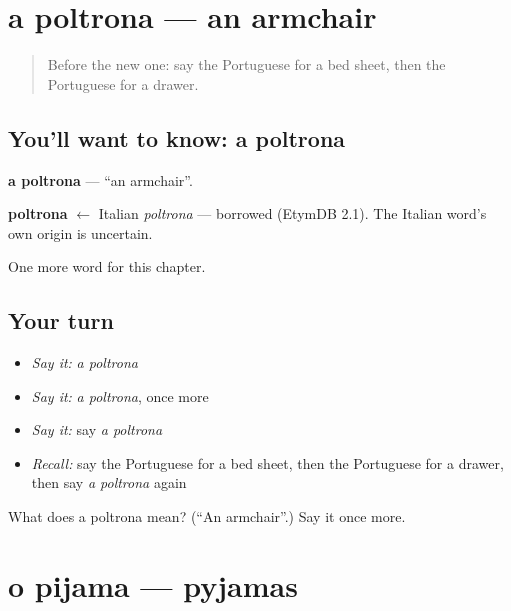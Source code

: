 \section[a poltrona]{a poltrona — an armchair}

\label{lesson:PT-C188-poltrona}



\begin{quote}
Before the new one: say the Portuguese for a bed sheet, then the Portuguese for a drawer.
\end{quote}

\subsection*{You'll want to know: a poltrona}
\textbf{a poltrona} — \textquotedblleft{}an armchair\textquotedblright{}.

\begin{cousinweb}
\textbf{poltrona} $\leftarrow$ Italian \emph{poltrona} — borrowed (EtymDB 2.1). The Italian word's own origin is uncertain.
\end{cousinweb}

\begin{grammarlens}[title={What you've built}]
One more word for this chapter.
\end{grammarlens}

\subsection*{Your turn}
\begin{itemize}
\raggedright
  \item \emph{Say it:} \emph{a poltrona}
  \item \emph{Say it:} \emph{a poltrona}, once more
  \item \emph{Say it:} say \emph{a poltrona}
  \item \emph{Recall:} say the Portuguese for a bed sheet, then the Portuguese for a drawer, then say \emph{a poltrona} again
\end{itemize}

\begin{tcolorbox}[breakable,colback=teal!4,colframe=teal!35!black,title={Before you move on}]
What does a poltrona mean? (\textquotedblleft{}An armchair\textquotedblright{}.) Say it once more.
\end{tcolorbox}
\section[o pijama]{o pijama — pyjamas}

